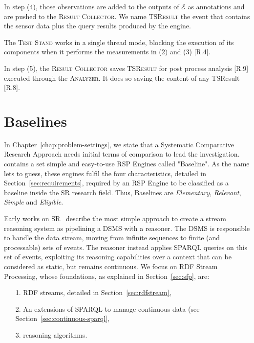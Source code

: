 In step (4), those observations are added to the outputs of $\mathcal{E}$ as annotations and are pushed to the \textsc{Result Collector}.  We name \textsc{TSResult} the event that contains the sensor data plus the query results produced by the engine.  

The \textsc{Test Stand} works in a single thread mode, blocking the execution of its components when it performs the measurements in (2) and (3) [R.4].  

In step (5), the \textsc{Result Collector} saves \textsc{TSResult} for post process analysis [R.9] executed through the \textsc{Analyzer}. It does so saving the content of any TSResult  [R.8].

\section{Baselines}\label{sec:baselines}

\noindent In Chapter~\ref{chap:problem-settings}, we state that a Systematic Comparative Research Approach needs initial terms of comparison to lead the investigation. \name contains a set simple and easy-to-use RSP Engines called "Baseline". As the name lets to guess, these engines fulfil the four characteristics, detailed in Section~\ref{sec:requirements}, required by an RSP Engine to be classified as a baseline inside the SR research field. Thus, \name Baselines are \textit{Elementary}, \textit{Relevant}, \textit{Simple} and \textit{Eligible}.

Early works on SR~\cite{DBLP:conf/fis/ValleCBBC08,Walavalkar08streamingknowledge} describe the most simple approach to create a stream reasoning system as pipelining a DSMS with a reasoner. The DSMS is responsible to handle the data stream, moving from infinite sequences to finite (and processable) sets of events. The reasoner instead applies SPARQL queries on this set of events, exploiting its reasoning capabilities over a context that can be considered as static, but remains continuous. We focus on RDF Stream Processing, whose foundations, as explained in Section~\ref{sec:sfp}, are: 
\begin{enumerate}
\item[1.] RDF streams, detailed in Section~\ref{sec:rdfstream},
\item[2.] An extensions of SPARQL to manage continuous data (see Section~\ref{sec:continuous-sparql},
\item[3.] reasoning algorithms.
\end{enumerate}

